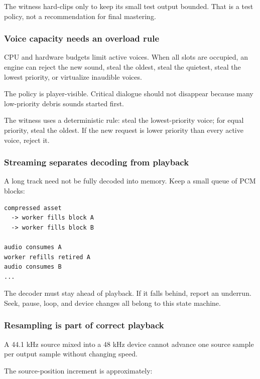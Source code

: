 The witness hard-clips only to keep its small test output bounded. That is a test policy, not a recommendation for final mastering.

\subsubsection{Voice capacity needs an overload rule}\label{05-engine-i-ch009-voice-capacity-needs-an-overload-rule}

CPU and hardware budgets limit active voices. When all slots are occupied, an engine can reject the new sound, steal the oldest, steal the quietest, steal the lowest priority, or virtualize inaudible voices.

The policy is player-visible. Critical dialogue should not disappear because many low-priority debris sounds started first.

The witness uses a deterministic rule: steal the lowest-priority voice; for equal priority, steal the oldest. If the new request is lower priority than every active voice, reject it.

\subsubsection{Streaming separates decoding from playback}\label{05-engine-i-ch009-streaming-separates-decoding-from-playback}

A long track need not be fully decoded into memory. Keep a small queue of PCM blocks:

\begin{verbatim}
compressed asset
  -> worker fills block A
  -> worker fills block B

audio consumes A
worker refills retired A
audio consumes B
...
\end{verbatim}

The decoder must stay ahead of playback. If it falls behind, report an underrun. Seek, pause, loop, and device changes all belong to this state machine.

\subsubsection{Resampling is part of correct playback}\label{05-engine-i-ch009-resampling-is-part-of-correct-playback}

A 44.1 kHz source mixed into a 48 kHz device cannot advance one source sample per output sample without changing speed.

The source-position increment is approximately:

